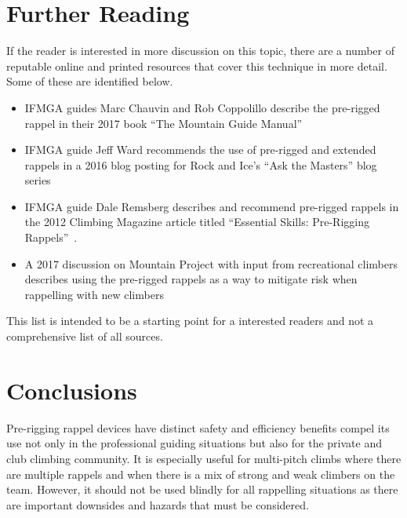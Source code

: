\documentclass[nonacm,acmtog]{acmart}
\begin{document}
\section{Further Reading}
\label{sec:reading}

If the reader is interested in more discussion on this topic, there are a
number of reputable online and printed resources that cover this technique in
more detail.  Some of these are identified below.

\begin{itemize}
\item IFMGA guides Marc Chauvin and Rob Coppolillo describe the pre-rigged
   rappel in their 2017 book ``The Mountain Guide Manual'' \cite[pp. 182-183]{mgm}
\item IFMGA guide Jeff Ward recommends the use of pre-rigged and extended
   rappels in a 2016 blog posting for Rock and Ice's ``Ask the Masters'' blog
   series~\cite{www:ri-askthemaster-prerigged}
\item IFMGA guide Dale Remsberg describes and recommend pre-rigged rappels in
   the 2012 Climbing Magazine article titled ``Essential Skills: Pre-Rigging
   Rappels''~\cite{www:climbing-prerigged}.
\item A 2017 discussion on Mountain Project with input from recreational
   climbers describes using the pre-rigged rappels as a way to mitigate risk
   when rappelling with new climbers~\cite{www:mp-prerigged}
\end{itemize}

This list is intended to be a starting point for a interested readers and not a
comprehensive list of all sources.


\section{Conclusions}
\label{sec:conclusion}

  Pre-rigging rappel devices have distinct safety and efficiency benefits
  compel its use not only in the professional guiding situations but also for
  the private and club climbing community. It is especially useful for
  multi-pitch climbs where there are multiple rappels and when there is a mix
  of strong and weak climbers on the team.  However, it should not be used
  blindly for all rappelling situations as there are important downsides and
  hazards that must be considered.




\end{document}
